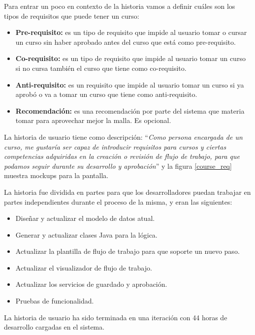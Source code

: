 Para entrar un poco en contexto de la historia vamos a definir cuáles son los tipos de requisitos que puede tener un curso:

\begin{itemize}
	\item \textbf{Pre-requisito:} es un tipo de requisito que impide al usuario tomar o cursar un curso sin haber aprobado antes del curso que está como pre-requisito.
	\item \textbf{Co-requisito:} es un tipo de requisito que impide al usuario tomar un curso si no cursa también el curso que tiene como co-requisito.
	\item \textbf{Anti-requisito:} es un requisito que impide al usuario tomar un curso si ya aprobó o va a tomar un curso que tiene como anti-requisito.
	\item \textbf{Recomendación:} es una recomendación por parte del sistema que materia tomar para aprovechar mejor la malla. Es opcional.
\end{itemize}

La historia de usuario tiene como descripción: \enquote{\textit{Como persona encargada de un curso, me gustaría ser capaz de introducir requisitos para cursos y ciertas competencias adquiridas en la creación o revisión de flujo de trabajo, para que podamos seguir durante su desarrollo y aprobación}} y la figura \ref{course_req} muestra mockups para la pantalla.

La historia fue dividida en partes para que los desarrolladores puedan trabajar en partes independientes durante el proceso de la misma, y eran las siguientes:
\begin{itemize}
	\item Diseñar y actualizar el modelo de datos atual.
	\item Generar y actualizar clases Java para la lógica.
	\item Actualizar la plantilla de flujo de trabajo para que soporte un nuevo paso.
	\item Actualizar el visualizador de flujo de trabajo.
	\item Actualizar los servicios de guardado y aprobación.
	\item Pruebas de funcionalidad.
\end{itemize}

La historia de usuario ha sido terminada en una iteración con 44 horas de desarrollo cargadas en el sistema.

